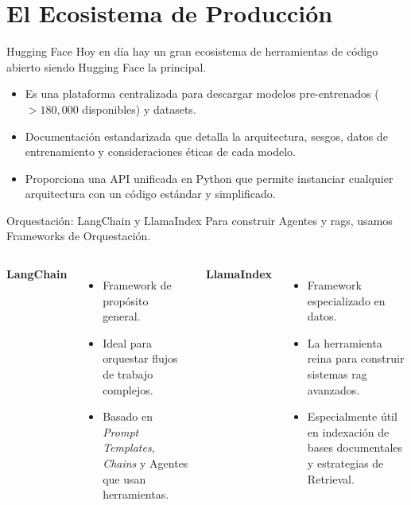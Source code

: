 \section{El Ecosistema de Producción}

\begin{frame}{Hugging Face}
Hoy en día hay un gran ecosistema de herramientas de \alert{código abierto} siendo \alert{Hugging Face} \cite{wolf2020transformers} la principal.

\begin{itemize}
    \item Es una \alert{plataforma centralizada} para descargar modelos pre-entrenados ($>180,000$ disponibles) y datasets.
    \item \alert{Documentación estandarizada} que detalla la arquitectura, sesgos, datos de entrenamiento y consideraciones éticas de cada modelo.
    \item Proporciona una API unificada en \alert{Python} que permite instanciar cualquier arquitectura con un código estándar y simplificado.
\end{itemize}
\end{frame}

\begin{frame}{Orquestación: LangChain y LlamaIndex}
Para construir Agentes y \glspl{rag}, usamos \alert{Frameworks de Orquestación}.

\begin{columns}
\textbf{\alert{LangChain}} \cite{chase2022langchain}
\begin{itemize}
    \item Framework de \alert{propósito general}.
    \item Ideal para orquestar \alert{flujos de trabajo} complejos.
    \item Basado en \textit{Prompt Templates}, \textit{Chains} y Agentes que usan herramientas.
\end{itemize}

\newline
\newline
\textbf{\alert{LlamaIndex}} \cite{Liu_LlamaIndex_2022}
\begin{itemize}
    \item Framework especializado en \alert{datos}.
    \item La herramienta reina para construir sistemas \alert{\gls{rag} avanzados}.
    \item Especialmente útil en \alert{indexación} de bases documentales y estrategias de Retrieval.
\end{itemize}
\end{columns}
\end{frame}

